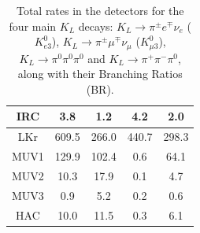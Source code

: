 \documentclass[../../main.tex]{subfiles}
\begin{document}
\begin{table}[htbp]
{\begin{tabular}{|c|ccll}
            IRC & \multicolumn{1}{c|}{3.8} & \multicolumn{1}{c|}{1.2} & \multicolumn{1}{c|}{4.2} & \multicolumn{1}{c|}{2.0} \\ \hline
            LKr & \multicolumn{1}{c|}{609.5} & \multicolumn{1}{c|}{266.0} & \multicolumn{1}{c|}{440.7} & \multicolumn{1}{c|}{298.3} \\ \hline
            MUV1 & \multicolumn{1}{c|}{129.9} & \multicolumn{1}{c|}{102.4} & \multicolumn{1}{c|}{0.6} & \multicolumn{1}{c|}{64.1} \\ \hline
            MUV2 & \multicolumn{1}{c|}{10.3} & \multicolumn{1}{c|}{17.9} & \multicolumn{1}{c|}{0.1} & \multicolumn{1}{c|}{4.7} \\ \hline
            MUV3 & \multicolumn{1}{c|}{0.9} & \multicolumn{1}{c|}{5.2} & \multicolumn{1}{c|}{0.2} & \multicolumn{1}{c|}{0.6} \\ \hline
            HAC & \multicolumn{1}{c|}{10.0} & \multicolumn{1}{c|}{11.5} & \multicolumn{1}{c|}{0.3} & \multicolumn{1}{c|}{6.1} \\ \hline
            \end{tabular}
        }
        \caption{Total rates in the detectors for the four main $K_L$ decays: $ K_L \to \pi^{\pm} e^{\mp} \nu_e$ ($K_{e3}^{0}$), $ K_L \to \pi^{\pm} \mu^{\mp} \nu_{\mu}$ ($K_{\mu 3}^{0}$), $ K_L \to \pi^{0} \pi^{0} \pi^{0}$ and $ K_L \to \pi^{+} \pi^{-} \pi^{0}$, along with their Branching Ratios (BR).}%
        \label{tab:totalRatesInDetectors}
    \end{table}
    
\end{document}
